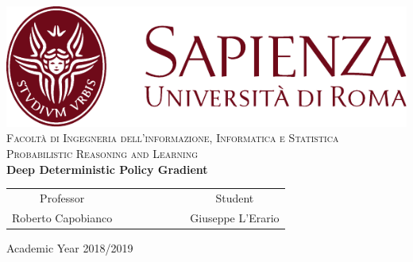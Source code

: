 \begin{titlepage}
\begin{center}
	\includegraphics[scale=0.8]{images/SapienzaLogo} \\
	\vspace{3em}
	{\large \textsc{Facoltà di  Ingegneria dell'informazione, Informatica e Statistica}} \\
	\vspace{2em}
	{\large \textsc{Probabilistic Reasoning and Learning}} \\
	\doublespacing
	\vspace{5em}
	{\Large \textbf{Deep Deterministic Policy Gradient}}
\end{center}

\vskip 2cm
\begin{center}
\begin{tabular}{c c c c c c c c}
	Professor & & & & & & & Student \\[0.2cm]
	\large{Roberto Capobianco} & & & & & & & \large{Giuseppe L'Erario}\\[0.4cm]
\end{tabular}
\end{center}

\vskip 1.5cm
\begin{center}
	{\normalsize Academic Year 2018/2019}
\end{center}
\end{titlepage}

\clearpage{\pagestyle{empty}\cleardoublepage}

\vspace{5em}

\onehalfspacing

\clearpage{\pagestyle{empty}\cleardoublepage}
